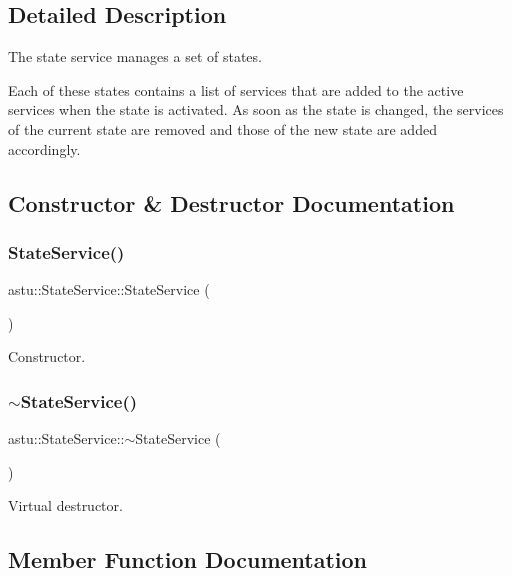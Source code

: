 \subsection{Detailed Description}
The state service manages a set of states.

Each of these states contains a list of services that are added to the active services when the state is activated. As soon as the state is changed, the services of the current state are removed and those of the new state are added accordingly. 

\subsection{Constructor \& Destructor Documentation}
\mbox{\label{classastu_1_1StateService_ae8be300ce5fd92351d52fc7162ce9793}} 
\subsubsection{\texorpdfstring{State\+Service()}{StateService()}}
{\footnotesize\ttfamily astu\+::\+State\+Service\+::\+State\+Service (\begin{DoxyParamCaption}{ }\end{DoxyParamCaption})}

Constructor. \mbox{\label{classastu_1_1StateService_a27bbe3ef0f9a4600c559ca9f6def3f5f}} 
\subsubsection{\texorpdfstring{$\sim$\+State\+Service()}{~StateService()}}
{\footnotesize\ttfamily astu\+::\+State\+Service\+::$\sim$\+State\+Service (\begin{DoxyParamCaption}{ }\end{DoxyParamCaption})\hspace{0.3cm}{\ttfamily [inline]}}

Virtual destructor. 

\subsection{Member Function Documentation}
\mbox{\label{classastu_1_1StateService_a5b6125be259b52bf9f3e80453def9e21}} 
